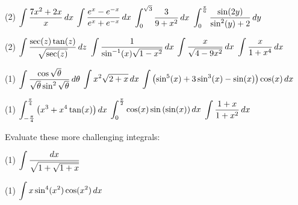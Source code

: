 \documentclass[mathNotesPreamble]{subfiles}
\begin{document}
  \begin{tasks}[after-item-skip=\stretch{1}, resume](2)
    \task $\ds\int \frac{7x^2+2x}{x}\,dx$
    \task $\ds\int \frac{e^x-e\inv[x]}{e^x+e\inv[x]}\,dx$
    \task $\ds\int_0^{\sqrt{3}} \frac{3}{9+x^2}\,dx$
    \task $\ds\int_0^{\frac{\pi}{6}} \frac{\sin(2y)}{\sin^2(y)+2}\,dy$
  \end{tasks}
  \pagebreak
  
  \begin{tasks}[after-item-skip=\stretch{1}, resume](2)
    \task $\ds\int \frac{\sec(z)\tan(z)}{\sqrt{\sec(z)}}\,dz$
    \task $\ds\int \frac{1}{\sin\inv(x)\sqrt{1-x^2}}\,dx$
    \task $\ds\int \frac{x}{\sqrt{4-9x^2}}\,dx$
    \task $\ds\int \frac{x}{1+x^4}\,dx$
  \end{tasks}
  \pagebreak
  
  \begin{tasks}[after-item-skip=\stretch{1}, resume](1)
    \task $\ds\int \frac{\cos\sqrt{\theta}}{\sqrt{\theta}\sin^2\sqrt{\theta}}\,d\theta$
    \task $\ds\int x^2\sqrt{2+x}\,dx$
    \task* $\ds\int \parens{\sin^5(x)+3\sin^3(x)-\sin(x)}\cos(x)\,dx$
  \end{tasks}
  \pagebreak
  
  \begin{tasks}[after-item-skip=\stretch{1}, resume](1)
    \task $\ds\int_{-\frac{\pi}{4}}^{\frac{\pi}{4}} \parens{x^3+x^4\tan(x)}\,dx$
    \task $\ds\int_{0}^{\frac{\pi}{2}} \cos(x)\sin\parens{\sin(x)}\,dx$
    \task $\ds\int \frac{1+x}{1+x^2}\,dx$
  \end{tasks}
  \pagebreak

  \noindent
  \begin{ex*}
    Evaluate these more challenging integrals:
  \end{ex*}
  \begin{tasks}[after-item-skip=\stretch{1}](1)
    \task $\ds\int \frac{dx}{\sqrt{1+\sqrt{1+x}}}$
  \end{tasks}
  \pagebreak  
  
  \begin{tasks}[after-item-skip=\stretch{1}, resume](1)
    \task $\ds\int x\sin^4(x^2)\cos(x^2)\,dx$
  \end{tasks}
  \pagebreak  
\end{document}
